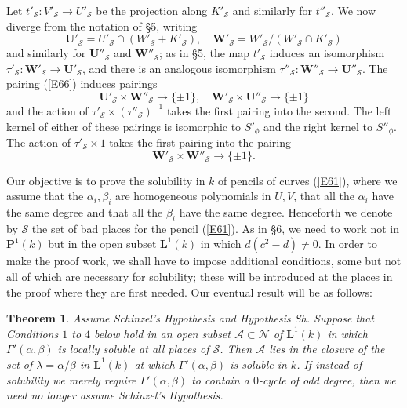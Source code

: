 \documentclass[12pt]{article}
\def\bL{{\mathbf L}}
\def\bP{{\mathbf P}}
\def\bU{{\mathbf U}}
\def\bW{{\mathbf W}}
\def\ga{{\alpha}}
\def\gb{{\beta}}
\def\gG{{\Gamma}}
\def\gl{{\lambda}}
\def\sA{{\mathcal A}}
\def\sN{{\mathcal N}}
\def\sS{{\mathcal S}}
\def\Sha{\mbox{\wncyr Sh}}
\def\beq{\begin{equation} \label}
\def\bth{\begin{theorem} \label}
\def\eth{\end{theorem}}
\newtheorem{theorem}{Theorem}
\begin{document}
Let $t'_\sS:V'_\sS\rightarrow U'_\sS$ be the projection along
$K'_\sS$ and similarly for $t''_\sS$. We now diverge from the
notation of \S5, writing
\[ \bU'_\sS=U'_\sS\cap(W'_\sS+K'_\sS), \quad
\bW'_\sS=W'_\sS/(W'_\sS\cap K'_\sS) \]
and similarly for $\bU''_\sS$ and $\bW''_\sS$; as in \S5, the
map $t'_\sS$ induces an isomorphism $\tau'_\sS:\bW'_\sS
\rightarrow \bU'_\sS$, and there is an analogous isomorphism
$\tau''_\sS:\bW''_\sS\rightarrow \bU''_\sS$. The pairing
(\ref{E66}) induces pairings
\beq{E67} \bU'_\sS\times\bW''_\sS\rightarrow\{\pm1\}, \quad
\bW'_\sS\times\bU''_\sS\rightarrow\{\pm1\} \end{equation}
and the action of $\tau'_\sS\times(\tau''_\sS)^{-1}$ takes the
first pairing into the second. The left kernel of either of
these pairings is isomorphic to $S'_\phi$ and the right kernel
to $S''_\phi$. The action of $\tau'_\sS\times1$ takes the
first pairing into the pairing
\[ \bW'_\sS\times\bW''_\sS\rightarrow\{\pm1\}. \]

\medskip

Our objective is to prove the solubility in $k$ of pencils of
curves (\ref{E61}), where we assume that the $\ga_i,\gb_i$ are
homogeneous polynomials in $U,V$, that all the $\ga_i$ have
the same degree and that all the $\gb_i$ have the same degree.
Henceforth we denote by $\sS$ the set of bad places for the
pencil (\ref{E61}). As in \S6, we need to work not in
$\bP^1(k)$ but in the open
subset $\bL^1(k)$ in which $d(c^2-d)\neq0$. In order to make
the proof work, we shall have to impose additional conditions,
some but not all of which are necessary for solubility; these
will be introduced at the places in the proof where they are
first needed. Our eventual result will be as follows:
\bth{T10} Assume Schinzel's Hypothesis and Hypothesis \Sha.
Suppose that Conditions $1$ to $4$ below hold in an open subset
$\sA\subset\sN$ of $\bL^1(k)$ in which $\gG'(\ga,\gb)$ is
locally soluble at all places of $\sS$. Then $\sA$ lies in the
closure of the set of $\gl=\ga/\gb$ in $\bL^1(k)$ at which
$\gG'(\ga,\gb)$ is soluble in $k$. If instead of solubility
we merely require $\gG'(\ga,\gb)$ to contain a $0$-cycle of
odd degree, then we need no longer assume Schinzel's
Hypothesis.
\eth
\end{document}
